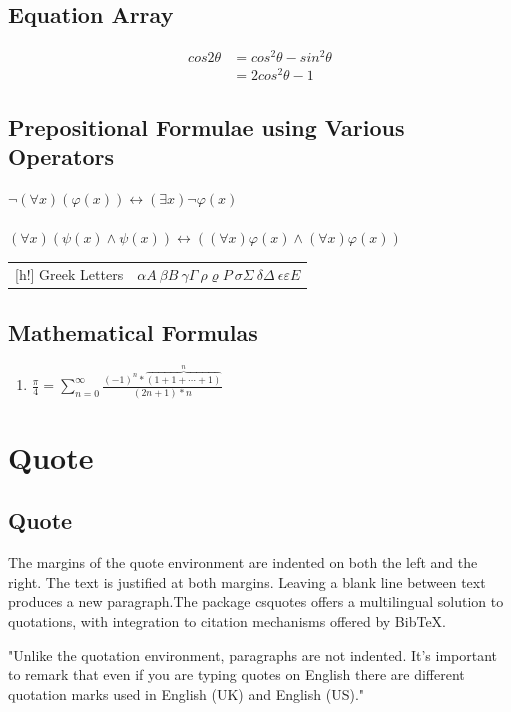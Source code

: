 \documentclass[titlepage,a4paper]{article}
\begin{document}
\subsection{Equation Array}
\begin{eqnarray}
cos2\theta & = cos^{2}\theta-sin^{2}\theta\\
&= 2cos^{2}\theta-1
\end{eqnarray}


\subsection{Prepositional Formulae using Various Operators}
$\neg(\forall x)(\varphi(x))\longleftrightarrow(\exists x)\neg\varphi(x)$\\
\\
$(\forall x)(\psi(x)\wedge\psi(x))\longleftrightarrow((\forall x)\varphi(x)\wedge(\forall x)\varphi(x))$
\begin{table}
\begin{tabular}{|c|c|}[h!]
Greek Letters & $\alpha A\ \beta B\ \gamma\Gamma\ \rho\varrho P\ \sigma\Sigma\ \delta\Delta\ \epsilon\varepsilon E$\\
\end{tabular}
\end{table}
\subsection{Mathematical Formulas}
\begin{enumerate}
\item $\frac{\pi}{4}=\sum \limits_{n=0}^{\infty}\frac{(-1)^{n}*\overbrace{(1+1+\cdots+1)}^{n}}{(2n+1)*n}$
\end{enumerate}




\section{Quote}
\subsection{Quote}
The margins of the quote environment are indented on both the left and the
right. The text is justified at both margins. Leaving a blank line between text
produces a new paragraph.The package csquotes offers a multilingual solution
to quotations, with integration to citation mechanisms offered by BibTeX.
\begin{displayquote}
"Unlike the quotation environment, paragraphs are not indented. It’s
important to remark that even if you are typing quotes on English
there are different quotation marks used in English (UK) and English
(US)."
\end{displayquote}
\end{document}
